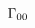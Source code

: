 \documentclass[10pt]{amsart}
\theoremstyle{break}
\begin{document}
\begin{figure}[hbt]
\begin{equation*}
\xymatrix{

\unitlength 0.1in
\begin{picture}(6.05,9.00)(2.00,-10.00)
\special{pn 8}\special{pa 400 800}\special{pa 405 832}\special{pa 422 861}\special{pa 449 885}\special{pa 482 898}\special{pa 517 898}\special{pa 550 885}\special{pa 577 862}\special{pa 595 833}\special{pa 600 801}\special{pa 600 289}\special{pa 591 258}\special{pa 569 230}\special{pa 540 210}\special{pa 506 200}\special{pa 472 205}\special{pa 440 222}\special{pa 416 247}\special{pa 402 278}\special{pa 400 300}\special{sp}\special{pn 8}\special{pa 400 600}\special{pa 400 500}\special{fp}\special{pn 8}\special{pa 200 600}\special{pa 200 500}\special{fp}\special{pn 8}\special{pa 200 800}\special{pa 200 832}\special{pa 200 864}\special{pa 200 896}\special{pa 207 928}\special{pa 225 958}\special{pa 251 982}\special{pa 282 997}\special{pa 315 1000}\special{pa 699 1000}\special{pa 731 992}\special{pa 760 973}\special{pa 784 946}\special{pa 798 915}\special{pa 800 883}\special{pa 800 211}\special{pa 796 179}\special{pa 780 148}\special{pa 755 122}\special{pa 724 105}\special{pa 692 100}\special{pa 308 100}\special{pa 276 105}\special{pa 246 122}\special{pa 221 148}\special{pa 204 178}\special{pa 200 210}\special{pa 200 242}\special{pa 200 274}\special{pa 200 300}\special{sp}\special{sh 1}\special{pa 600 420}\special{pa 620 353}\special{pa 600 367}\special{pa 580 353}\special{pa 600 420}\special{fp}\special{sh 1}\special{pa 800 420}\special{pa 820 353}\special{pa 800 367}\special{pa 780 353}\special{pa 800 420}\special{fp}\special{pn 8}\special{pa 400 800}\special{pa 397 768}\special{pa 387 737}\special{pa 380 706}\special{pa 384 675}\special{pa 393 644}\special{pa 400 612}\special{pa 400 600}\special{sp}\special{pn 8}\special{pa 200 800}\special{pa 203 768}\special{pa 213 737}\special{pa 220 706}\special{pa 216 675}\special{pa 207 644}\special{pa 200 612}\special{pa 200 600}\special{sp}\special{pn 8}\special{pa 400 500}\special{pa 397 468}\special{pa 387 437}\special{pa 380 406}\special{pa 384 375}\special{pa 393 344}\special{pa 400 312}\special{pa 400 300}\special{sp}\special{pn 8}\special{pa 200 500}\special{pa 203 468}\special{pa 213 437}\special{pa 220 406}\special{pa 216 375}\special{pa 207 344}\special{pa 200 312}\special{pa 200 300}\special{sp}\put(5.00,-11.00000){\makebox(0,0){$\Gamma_{00}$}}\end{picture}&&
\unitlength 0.1in
\begin{picture}(6.05,9.00)(2.00,-10.00)

\end{picture}}
\end{equation*}
\end{figure}
\end{document}
